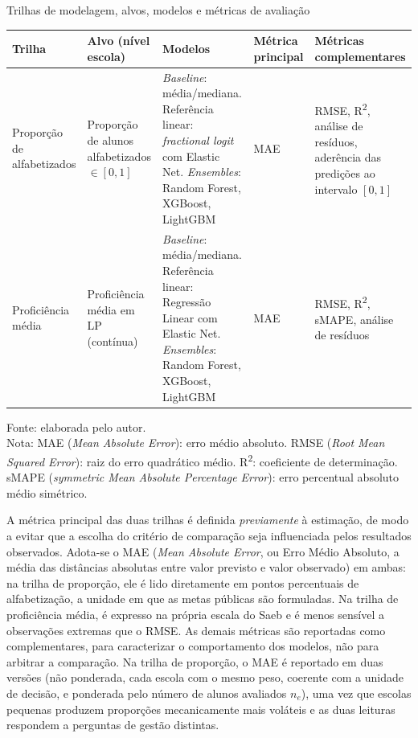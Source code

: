\begin{quadro}[H]
    \centering
    \footnotesize
    \caption{Trilhas de modelagem, alvos, modelos e métricas de avaliação}
    \begin{tabular}{|P{2.2cm}|P{2.2cm}|P{3.0cm}|P{1.6cm}|P{3.2cm}|}
        \hline
        \textbf{Trilha} & \textbf{Alvo (nível escola)} & \textbf{Modelos} & \textbf{Métrica principal} & \textbf{Métricas complementares} \\
        \hline
        Proporção de alfabetizados & Proporção de alunos alfabetizados
        $\in [0,1]$ & \textit{Baseline}: média/mediana. Referência linear:
        \textit{fractional logit} com Elastic Net. \textit{Ensembles}: Random
        Forest, XGBoost, LightGBM & MAE & RMSE, R\textsuperscript{2},
        análise de resíduos, aderência das predições ao intervalo $[0,1]$ \\ \hline
        Proficiência média & Proficiência média em LP (contínua) &
        \textit{Baseline}: média/mediana. Referência linear: Regressão
        Linear com Elastic Net. \textit{Ensembles}: Random Forest, XGBoost,
        LightGBM & MAE & RMSE, R\textsuperscript{2}, sMAPE, análise de
        resíduos \\
        \hline
    \end{tabular}
    \vspace{0.1cm}
    \begin{flushleft}
    {\footnotesize Fonte: elaborada pelo autor.\\
    Nota: MAE (\textit{Mean Absolute Error}): erro médio absoluto. RMSE
    (\textit{Root Mean Squared Error}): raiz do erro quadrático médio.
    R\textsuperscript{2}: coeficiente de determinação. sMAPE (\textit{symmetric
    Mean Absolute Percentage Error}): erro percentual absoluto médio simétrico.}
    \end{flushleft}
    \label{quad:trilhas}
\end{quadro}

A métrica principal das duas trilhas é definida \emph{previamente} à
estimação, de modo a evitar que a escolha do critério de comparação seja
influenciada pelos resultados observados. Adota-se o MAE (\emph{Mean
Absolute Error}, ou Erro Médio Absoluto, a média das distâncias absolutas
entre valor previsto e valor observado) em ambas: na
trilha de proporção, ele é lido diretamente em pontos percentuais de
alfabetização, a unidade em que as metas públicas são formuladas. Na trilha
de proficiência média, é expresso na própria escala do Saeb e é menos
sensível a observações extremas que o RMSE. As demais métricas são
reportadas como complementares, para caracterizar o comportamento dos
modelos, não para arbitrar a comparação. Na trilha de proporção, o MAE é
reportado em duas versões (não ponderada, cada escola com o mesmo peso,
coerente com a unidade de decisão, e ponderada pelo número de alunos
avaliados $n_e$), uma vez que escolas pequenas produzem proporções
mecanicamente mais voláteis e as duas leituras respondem a perguntas de
gestão distintas.


